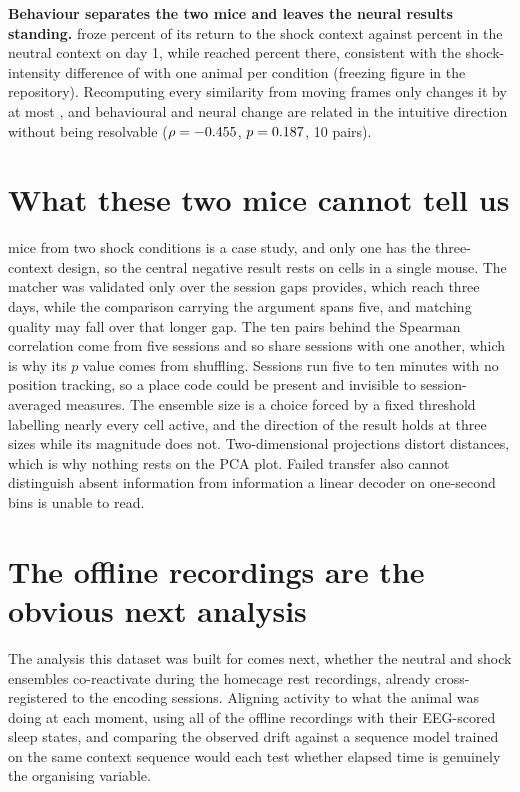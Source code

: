 \documentclass[11pt,a4paper]{article}
\begin{document}
\textbf{Behaviour separates the two mice and leaves the neural results standing.}
\numDatasetStrongShockMouse{} froze \numBehaviourFreezingStrongRecallOne{} percent of its return
to the shock context against \numBehaviourFreezingStrongNeutral{} percent in the neutral context
on day 1, while \numDatasetWeakShockMouse{} reached \numBehaviourFreezingWeakRecallOne{} percent
there, consistent with the shock-intensity difference of \citet{zaki2025} with one animal per
condition (freezing figure in the repository). Recomputing every similarity from moving frames
only changes it by at most \numBehaviourLargestChangeDroppingFrozen{}, and behavioural and
neural change are related in the intuitive direction without being resolvable
($\rho=-0.455{}$, $p=0.187{}$, 10 pairs).

\section{What these two mice cannot tell us}

\numDatasetMice{} mice from two shock conditions is a case study, and only one has the
three-context design, so the central negative result rests on \numMatchingCellsTrackedWeak{}
cells in a single mouse. The matcher was validated only over the
session gaps \numDatasetStrongShockMouse{} provides, which reach three days, while the
comparison carrying the argument spans five, and matching quality may fall over that longer gap.
The ten pairs behind the Spearman correlation come from five sessions and so share sessions with
one another, which is why its $p$ value comes from shuffling. Sessions run five to ten minutes with no position tracking, so a place
code could be present and invisible to session-averaged measures. The ensemble size is a choice forced by a fixed threshold labelling nearly every cell
active, and the direction of the result holds at three sizes while its magnitude does not.
Two-dimensional projections distort distances, which is why nothing rests on the PCA plot.
Failed transfer also cannot distinguish absent information from information a linear decoder on
one-second bins is unable to read.

\section{The offline recordings are the obvious next analysis}

The analysis this dataset was built for comes next, whether the neutral and shock ensembles
co-reactivate during the homecage rest recordings, already cross-registered to the encoding
sessions. Aligning activity to what the animal was doing at each moment, using all of the offline
recordings with their EEG-scored sleep states, and comparing the observed drift against a
sequence model trained on the same context sequence would each test whether elapsed time is
genuinely the organising variable.
\end{document}
